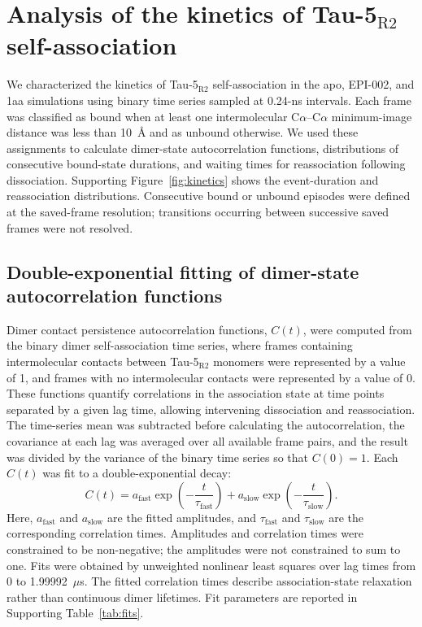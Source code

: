 \documentclass[11pt]{article}
\newcommand{\tauR}{Tau-5$_{\mathrm{R2}}$}
\begin{document}
\section*{Analysis of the kinetics of \tauR{} self-association}

We characterized the kinetics of \tauR{} self-association in the apo, EPI-002, and 1aa simulations using binary time series sampled at 0.24-ns intervals. Each frame was classified as bound when at least one intermolecular C$\alpha$--C$\alpha$ minimum-image distance was less than 10~\AA{} and as unbound otherwise. We used these assignments to calculate dimer-state autocorrelation functions, distributions of consecutive bound-state durations, and waiting times for reassociation following dissociation. Supporting Figure~\ref{fig:kinetics} shows the event-duration and reassociation distributions. Consecutive bound or unbound episodes were defined at the saved-frame resolution; transitions occurring between successive saved frames were not resolved.

\subsection*{Double-exponential fitting of dimer-state autocorrelation functions}

Dimer contact persistence autocorrelation functions, $C(t)$, were computed from the binary dimer self-association time series, where frames containing intermolecular contacts between \tauR{} monomers were represented by a value of 1, and frames with no intermolecular contacts were represented by a value of 0. These functions quantify correlations in the association state at time points separated by a given lag time, allowing intervening dissociation and reassociation. The time-series mean was subtracted before calculating the autocorrelation, the covariance at each lag was averaged over all available frame pairs, and the result was divided by the variance of the binary time series so that $C(0)=1$. Each $C(t)$ was fit to a double-exponential decay:
\begin{equation}
C(t)=a_{\mathrm{fast}}\exp\left(-\frac{t}{\tau_{\mathrm{fast}}}\right)
+a_{\mathrm{slow}}\exp\left(-\frac{t}{\tau_{\mathrm{slow}}}\right).
\end{equation}
Here, $a_{\mathrm{fast}}$ and $a_{\mathrm{slow}}$ are the fitted amplitudes, and $\tau_{\mathrm{fast}}$ and $\tau_{\mathrm{slow}}$ are the corresponding correlation times. Amplitudes and correlation times were constrained to be non-negative; the amplitudes were not constrained to sum to one. Fits were obtained by unweighted nonlinear least squares over lag times from 0 to 1.99992~$\mu$s. The fitted correlation times describe association-state relaxation rather than continuous dimer lifetimes. Fit parameters are reported in Supporting Table~\ref{tab:fits}.
\end{document}
